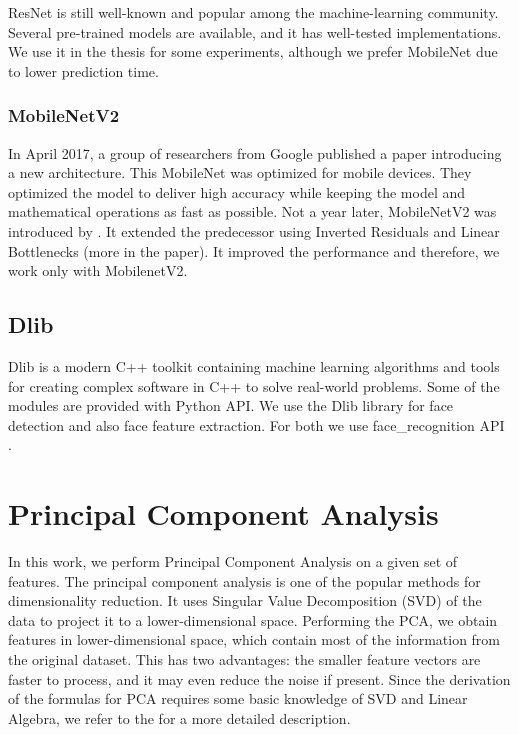 ResNet is still well-known and popular among the machine-learning community. Several pre-trained models are available, and it has well-tested implementations. We use it in the thesis for some experiments, although we prefer MobileNet due to lower prediction time.

\subsubsection*{MobileNetV2}

In April 2017, a group of researchers from Google published a paper \citep{mobilenet} introducing a new architecture. This MobileNet was optimized for mobile devices. They optimized the model to deliver high accuracy while keeping the model and mathematical operations as fast as possible. Not a year later, MobileNetV2 was introduced by \cite{mobilenetv2}. It extended the predecessor using Inverted Residuals and Linear Bottlenecks (more in the paper). It improved the performance and therefore, we work only with MobilenetV2.


\subsection{Dlib}
Dlib \citep{king2009dlib} is a modern C++ toolkit containing machine learning algorithms and tools for creating complex software in C++ to solve real-world problems. Some of the modules are provided with Python API. We use the Dlib library for face detection and also face feature extraction. For both we use face\_recognition API \citep{geitgey2016machine}. 


\section{Principal Component Analysis}

In this work, we perform Principal Component Analysis on a given set of features. The principal component analysis is one of the popular methods for dimensionality reduction. It uses Singular Value Decomposition (SVD) of the data to project it to a lower-dimensional space. Performing the PCA, we obtain features in lower-dimensional space, which contain most of the information from the original dataset. This has two advantages: the smaller feature vectors are faster to process, and it may even reduce the noise if present. Since the derivation of the formulas for PCA requires some basic knowledge of SVD and Linear Algebra, we refer to the \cite{alpaydin2020introduction} for a more detailed description.


